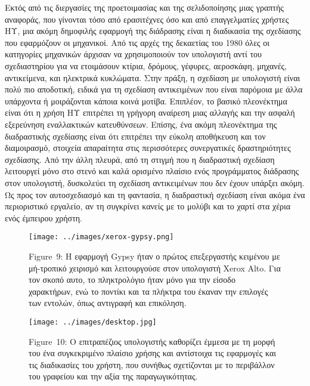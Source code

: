 \documentclass[
]{article}
\begin{document}
Εκτός από τις διεργασίες της προετοιμασίας και της σελιδοποίησης μιας
γραπτής αναφοράς, που γίνονται τόσο από ερασιτέχνες όσο και από
επαγγελματίες χρήστες ΗΥ, μια ακόμη δημοφιλής εφαρμογή της διάδρασης
είναι η διαδικασία της σχεδίασης που εφαρμόζουν οι μηχανικοί. Από τις
αρχές της δεκαετίας του 1980 όλες οι κατηγορίες μηχανικών άρχισαν να
χρησιμοποιούν τον υπολογιστή αντί του σχεδιαστηρίου για να ετοιμάσουν
κτίρια, δρόμους, γέφυρες, αεροσκάφη, μηχανές, αντικείμενα, και ηλεκτρικά
κυκλώματα. Στην πράξη, η σχεδίαση με υπολογιστή είναι πολύ πιο
αποδοτική, ειδικά για τη σχεδίαση αντικειμένων που είναι παρόμοια με
άλλα υπάρχοντα ή μοιράζονται κάποια κοινά μοτίβα. Επιπλέον, το βασικό
πλεονέκτημα είναι ότι η χρήση ΗΥ επιτρέπει τη γρήγορη αναίρεση μιας
αλλαγής και την ασφαλή εξερεύνηση εναλλακτικών κατευθύνσεων. Επίσης, ένα
ακόμη πλεονέκτημα της διαδραστικής σχεδίασης είναι ότι επιτρέπει την
εύκολη αποθήκευση και τον διαμοιρασμό, στοιχεία απαραίτητα στις
περισσότερες συνεργατικές δραστηριότητες σχεδίασης. Από την άλλη πλευρά,
από τη στιγμή που η διαδραστική σχεδίαση λειτουργεί μόνο στο στενό και
καλά ορισμένο πλαίσιο ενός προγράμματος διάδρασης στον υπολογιστή,
δυσκολεύει τη σχεδίαση αντικειμένων που δεν έχουν υπάρξει ακόμη. Ως προς
τον αυτοσχεδιασμό και τη φαντασία, η διαδραστική σχεδίαση είναι ακόμα
ένα περιοριστικό εργαλείο, αν τη συγκρίνει κανείς με το μολύβι και το
χαρτί στα χέρια ενός έμπειρου χρήστη.

\leavevmode{}%
\begin{figure}
\hypertarget{fig:xerox-gypsy}{%
\centering
\texttt{[image: ../images/xerox-gypsy.png]}
\caption{Figure~9: Η εφαρμογή Gypsy ήταν ο πρώτος επεξεργαστής κειμένου
με μή-τροπικό χειρισμό και λειτουργούσε στον υπολογιστή Xerox Alto. Για
τον σκοπό αυτο, το πληκτρολόγιο ήταν μόνο για την είσοδο χαρακτήρων, ενώ
το ποντίκι και τα πλήκτρα του έκαναν την επιλογές των εντολών, όπως
αντιγραφή και επικόληση.}\label{fig:xerox-gypsy}
}
\end{figure}

\leavevmode{}%
\begin{figure}
\hypertarget{fig:desktop}{%
\centering
\texttt{[image: ../images/desktop.jpg]}
\caption{Figure~10: Ο επιτραπέζιος υπολογιστής καθορίζει έμμεσα με τη
μορφή του ένα συγκεκριμένο πλαίσιο χρήσης και αντίστοιχα τις εφαρμογές
και τις διαδικασίες του χρήστη, που συνήθως σχετίζονται με το περιβάλλον
του γραφείου και την αξία της παραγωγικότητας.}\label{fig:desktop}
}
\end{figure}
\end{document}
